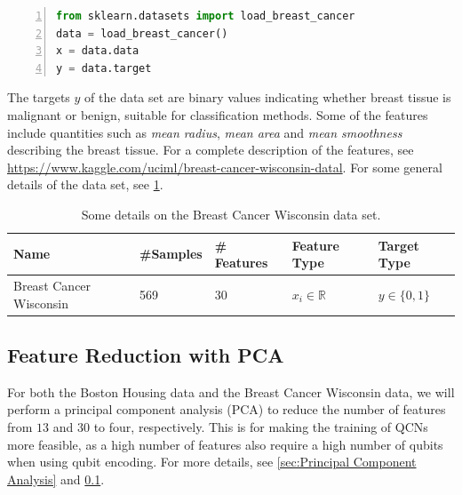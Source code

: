 \begin{lstlisting}[language=python, numbers=left]
from sklearn.datasets import load_breast_cancer
data = load_breast_cancer()
x = data.data
y = data.target
\end{lstlisting}

The targets $y$ of the data set are binary values indicating whether breast tissue is malignant or benign, suitable for classification methods. Some of the features include quantities such as \emph{mean radius}, \emph{mean area} and \emph{mean smoothness} describing the breast tissue. For a complete description of the features, see \url{https://www.kaggle.com/uciml/breast-cancer-wisconsin-datal}. For some general details of the data set, see \cref{tab:Cancer}.

\begin{table}[H]
\begin{tabular}{|l|l|l|l|l|}
\hline
 Name& \#Samples&  \# Features& Feature Type& Target Type \\ \hline
 Breast Cancer Wisconsin&  569&  30& $x_i \in \mathbb{R}$ & $y \in \{0,1\}$  \\ 
 \hline
 
\end{tabular}
\caption{Some details on the Breast Cancer Wisconsin data set.}
\label{tab:Cancer}
\end{table}


\subsection{Feature Reduction with PCA}\label{sec:Feature Reduction with PCA}
For both the Boston Housing data and the Breast Cancer Wisconsin data, we will perform a principal component analysis (PCA) to reduce the number of features from $13$ and $30$ to four, respectively. This is for making the training of QCNs more feasible, as a high number of features also require a high number of qubits when using qubit encoding. For more details, see \cref{sec:Principal Component Analysis} and \cref{sec:Feature Reduction with PCA}.






